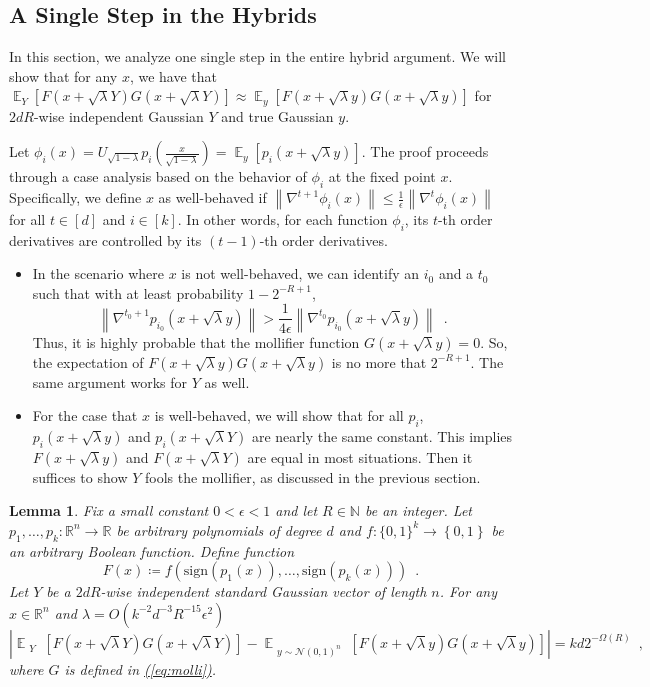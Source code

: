 \documentclass[12pt]{article}
\newtheorem{lemma}[theorem]{Lemma}
\newcommand{\eq}[1]{\hyperref[eq:#1]{(\ref*{eq:#1})}}
\newcommand{\N}{\mathbb{N}}  \newcommand{\R}{\mathbb{R}} \newcommand{\C}{\mathbb{C}} \newcommand{\U}{\mathbb{U}} \renewcommand{\d}{\mathrm{d}} \DeclareMathOperator*{\E}{\mathbb{E}}  \newcommand{\so}{\mathrm{SO}} \newcommand{\s}{\mathrm{S}} \newcommand{\su}{\mathrm{SU}} \renewcommand{\i}{\mathrm{i}} \newcommand{\A}{\mathcal{A}}  \newcommand{\B}{\mathcal{B}} \newcommand{\CC}{\mathcal{C}} \newcommand{\D}{\mathcal{D}} \newcommand{\F}{\mathcal{F}} \renewcommand{\H}{\mathcal{H}} \newcommand{\K}{\mathcal{K}} \newcommand{\NN}{\mathcal{N}} \newcommand{\V}{\mathcal{V}} \newcommand{\X}{\mathcal{X}} \newcommand{\Y}{\mathcal{Y}} \renewcommand{\S}{\mathcal{S}} \newcommand{\SR}{\mathcal{S}_{\R}} \newcommand{\SC}{\mathcal{S}_{\C}} \newcommand{\EE}{\mathcal{E}}  \newcommand{\PP}{\mathcal{P}} \newcommand{\KK}{\widetilde{K}} \newcommand{\LL}{\widetilde{L}} \newcommand{\W}{\widehat{W}} \newcommand{\f}{\hat{f}} \newcommand{\g}{\hat{g}} \newcommand{\h}{\hat{h}} \newcommand{\bit}[1]{\{0,1\}^{#1}} \newcommand{\wrt}{w.r.t.~} \newcommand{\us}{\overset{\$}{\leftarrow}} \newcommand{\set}[1]{\left\{#1\right\}} \newcommand{\lhs}{\mathrm{LHS}} \newcommand{\expec}[1]{\E\!\Br{#1}} \newcommand{\expect}[2]{\E_{\substack{#1}}\!\Br{#2}} \newcommand{\prob}[2]{\underset{#1}{\mathrm{Pr}}\!\Br{#2}} \newcommand{\cf}{\widetilde{f}} \newcommand{\cg}{\widetilde{g}} \newcommand{\ch}{\widetilde{h}} \newcommand{\ck}{\widetilde{K}} \newcommand{\rep}[2]{\br{#1}_{#2}} \newcommand{\AND}[1]{\mathrm{AND}\!\br{#1}}
\newcommand{\sign}[1]{\mathrm{sign}\!\br{#1}}
\newcommand{\grad}[2]{\nabla^{#1}{#2}}
\newcommand{\br}[1]{\left(#1\right)} \newcommand{\Br}[1]{\left[#1\right]} \newcommand{\st}[1]{\left\{#1\right\}} \newcommand{\tr}[1]{\mathrm{Tr}\!\Br{#1}} \newcommand{\abs}[1]{\left|#1 \right|} \newcommand{\norm}[1]{\left\lVert #1 \right\rVert} \newcommand{\agl}[2]{\theta^{\br{#1}}_{#2}} \newcommand{\aglp}[2]{{\theta'}^{\br{#1}}_{#2}} \newcommand{\lint}[1]{\left\lfloor#1\right\rfloor} \newcommand{\poly}[1]{\mathrm{poly}\!\br{#1}} \newcommand{\negl}[1]{\mathrm{negl}\!\br{#1}} \newcommand{\de}[1]{\mathrm{d}#1} \newcommand{\val}[1]{\mathrm{val}\!\br{#1}} \newcommand{\vall}[1]{\mathrm{val}\br{#1}} \newcommand{\nd}[1]{\mathcal{N}\!\br{#1}} \newcommand{\ketbratwo}[2]{\ket{#1} \hspace{-0.4em}\bra{#2}} \newcommand{\ketbra}[1]{\ketbratwo{#1}{#1}} \newcommand{\id}{\ensuremath{\mathds{1}}} \newcommand{\ogroup}[1]{\mathrm{O}\!\br{#1}} \newcommand{\ugroup}[1]{\mathrm{U}\!\br{#1}} \newcommand{\td}{\mathrm{TD}} \newcommand{\tv}[1]{\norm{#1}_{\mathrm{TV}}} \newcommand {\defeq} {\ensuremath{ \stackrel{\mathrm{def}}{=} }} \newcommand{\vdim}{\ensuremath{N}} \newcommand{\dimin}{\ensuremath{n}} \newcommand{\dimout}{\ensuremath{m}} \newcommand{\ncopy}{\ell} \newcommand{\hspacein}{\H_\mathrm{in}} \newcommand{\hspaceout}{\H_\mathrm{out}} \newcommand{\Sin}{\S(\hspacein)} \newcommand{\Sout}{\S(\hspaceout)} \newcommand{\haar}{\ensuremath{\mu}} \newcommand{\tensorhaar}{\ensuremath{\eta}} \newcommand{\tensorsrss}{\ensuremath{\nu}} \newcommand{\qadvice}{\ensuremath{\rho}} \newcommand{\tp}{\otimes} \newcommand{\wone}[2]{W_1\!\br{#1,#2}}
\begin{document}
\subsection{A Single Step in the Hybrids} \label{sec:single}
In this section,
we analyze one single step in the entire hybrid argument.
We will show that for any $x$, we have that
$\E_Y[F(x+\sqrt{\lambda}Y)G(x+\sqrt{\lambda}Y)]\approx
\E_y[F(x+\sqrt{\lambda}y)G(x+\sqrt{\lambda}y)]$ for $2dR$-wise independent Gaussian $Y$ and true Gaussian $y$.

Let $\phi_i(x) = U_{\sqrt{1-\lambda}} p_i\!\br{\frac{x}{\sqrt{1-\lambda}}} = \E_y[p_i(x+\sqrt{\lambda}y)]$.
The proof proceeds through a case analysis
based on the behavior of $\phi_i$ at the fixed point $x$.
Specifically, we define $x$ as well-behaved if
$\norm{\grad{t+1}{\phi_i(x)}} \leq \frac{1}{\epsilon}\norm{\grad{t}{\phi_i(x)}}$ for all $t\in[d]$ and $i\in[k]$.
In other words, for each function $\phi_i$,
its $t$-th order derivatives are controlled by its
$(t-1)$-th order derivatives.
\begin{itemize}
	\item In the scenario where $x$ is not well-behaved,
	we can identify an $i_0$ and a $t_0$ such that
	with at least probability $1-2^{-R+1}$,
	\[
	\norm{ \grad{t_0+1}{p_{i_0}(x+\sqrt{\lambda}y)}}> \frac{1}{4\epsilon} \norm{ \grad{t_0}{p_{i_0}(x+\sqrt{\lambda}y)}} \enspace .
	\]
	Thus, it is highly probable that the mollifier function
	$G(x+\sqrt{\lambda}y)=0$.
	So, the expectation of $F(x+\sqrt{\lambda}y)G(x+\sqrt{\lambda}y)$ is no more that $2^{-R+1}$.
	The same argument works for $Y$ as well.
	\item For the case that $x$ is well-behaved,
	we will show that for all $p_i$,
	${ p_i(x+\sqrt{\lambda}y) }$ and ${ p_i(x+\sqrt{\lambda}Y) }$ are nearly the same constant. This implies
	$F(x+\sqrt{\lambda}y)$ and $F(x+\sqrt{\lambda}Y)$ are equal in most situations.
	Then it suffices to show $Y$ fools the mollifier,
	as discussed in the previous section.
\end{itemize}

\begin{lemma}\label{lem:hybrid}
	Fix a small constant $0<\epsilon<1$ and let $R\in\N$ be an integer. Let $p_1,\dots,p_k:\R^n \to \R$ be arbitrary polynomials of degree $d$ and $f:\bit{k}\to\st{0,1}$ be an arbitrary Boolean function.
	Define function
	\[
		F(x)\coloneqq f\!\br{\sign{p_1\!(x)},\dots,\sign{p_k\!(x)}}\enspace.
	\]
Let $Y$ be a $2dR$-wise independent standard Gaussian vector of length $n$.
	For any $x\in\R^n$ and $\lambda = O(k^{-2}d^{-3}R^{-15}\epsilon^2)$
	\[
	\abs{
		\expect{Y}{
			F(x+\sqrt{\lambda}Y)G(x+\sqrt{\lambda}Y)
		}
		-
		\expect{y\sim\NN\br{0,1}^n}{
			F(x+\sqrt{\lambda}y)G(x+\sqrt{\lambda}y)
		}
	} = kd2^{-\Omega(R)} \enspace ,
	\]
	where $G$ is defined in \eq{molli}.
\end{lemma}
\end{document}
